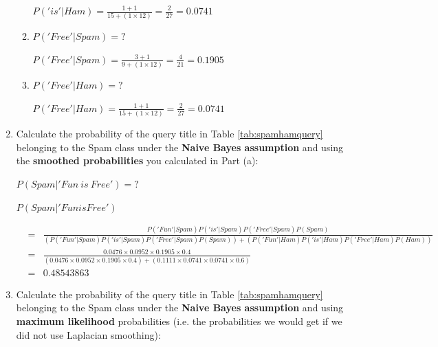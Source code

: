 \documentclass[--SOLUTION-OPTION--]{ditpaper}
\begin{document}
\begin{enumerate}
\begin{enumerate}
\begin{answer}
						$P('is'|Ham) = \frac{1+1}{15 + (1 \times 12)} = \frac{2}{27} = 0.0741$
					\end{answer}
				\item $P('Free'|Spam)=?$
					\begin{answer}
						$P('Free'|Spam) = \frac{3+1}{9 + (1 \times 12)} = \frac{4}{21} = 0.1905$
					\end{answer}
				\item $P('Free'|Ham)=?$
					\begin{answer}
						$P('Free'|Ham) = \frac{1+1}{15 + (1 \times 12)} = \frac{2}{27} = 0.0741$
					\end{answer}
			\end{enumerate}
		\item Calculate the probability of the query title in Table \ref{tab:spamhamquery} belonging to the Spam class under the \textbf{Naive Bayes assumption} and using the \textbf{smoothed probabilities} you calculated in Part (a):		
			\begin{center}
				$P(Spam|'Fun~is~Free')=?$
			\end{center}
			\begin{answer}
				$P(Spam|'Fun is Free')$ 
				\begin{scriptsize}
				\begin{eqnarray*}
					&=& \frac{P('Fun'|Spam)P('is'|Spam)P('Free'|Spam)P(Spam)}{(P('Fun'|Spam)P('is'|Spam)P('Free'|Spam)P(Spam))+(P('Fun'|Ham)P('is'|Ham)P('Free'|Ham)P(Ham))}\\
					&=& \frac{0.0476 \times 0.0952 \times 0.1905 \times 0.4}{(0.0476 \times 0.0952 \times 0.1905 \times 0.4) + (0.1111 \times 0.0741 \times  0.0741 \times 0.6)}\\
					&=& 0.48543863
				\end{eqnarray*}
				\end{scriptsize}
			\end{answer}
		\item Calculate the probability of the query title in Table \ref{tab:spamhamquery} belonging to the Spam class under the \textbf{Naive Bayes assumption} and using \textbf{maximum likelihood} probabilities (i.e. the probabilities we would get if we did not use Laplacian smoothing):	

\end{enumerate}
\end{document}
